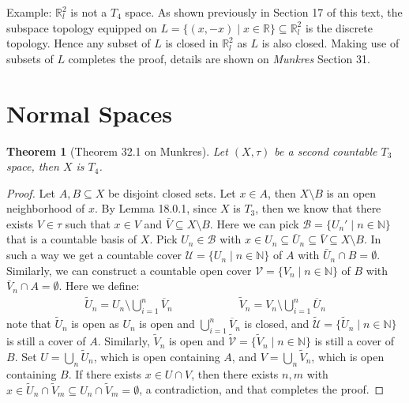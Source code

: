 \documentclass[11pt]{book}
\theoremstyle{break}
\theoremstyle{break}
\newtheorem{thm}{Theorem}[section]
\newcommand{\R}{\mathbb{R}}
\newcommand{\N}{\mathbb{N}}
\newcommand{\that}[1]{\widetilde{#1}}
\newcommand{\example}{\color{green}Example: \color{black}}
\begin{document}
\example $\R_l^2$ is not a $T_4$ space. As shown previously in Section 17 of this text, the subspace topology equipped on $L = \{(x,-x) \mid x \in \R\} \subseteq \R_l^2$ is the discrete topology. Hence any subset of $L$ is closed in $\R_l^2$ as $L$ is also closed. Making use of subsets of $L$ completes the proof, details are shown on \textit{Munkres} Section 31. 

\newpage
\section[Normal Spaces]{\color{red}Normal Spaces\color{black}}
\begin{thm}[Theorem 32.1 on Munkres]
Let $(X,\tau)$ be a second countable $T_3$ space, then $X$ is $T_4$. 
\end{thm}
\begin{proof}
Let $A,B\subseteq X$ be disjoint closed sets. Let $x \in A$, then $X\setminus B$ is an open neighborhood of $x$. By Lemma 18.0.1, since $X$ is $T_3$, then we know that there exists $V\in \tau$ such that $x \in V$ and $\bar{V} \subseteq X\setminus B$. Here we can pick $\mathcal{B} = \{U_n' \mid n \in \N\}$ that is a countable basis of $X$. Pick $U_n\in \mathcal{B}$ with $x \in U_n \subseteq \bar{U}_n\subseteq \bar{V}\subseteq  X\setminus B$. In such a way we get a countable cover $\mathcal{U} = \{U_n \mid n \in \N\}$ of $A$ with $\bar{U}_n \cap B = \emptyset$. Similarly, we can construct a countable open cover $\mathcal{V} = \{V_n \mid n \in \N\}$ of $B$ with $\bar{V}_n \cap A = \emptyset$. Here we define:
\begin{align*}
\that{U}_n = U_n \setminus \bigcup_{i=1}^n \overline{V}_n
\qquad\qquad\qquad 
\that{V}_n = V_n \setminus \bigcup_{i=1}^n \overline{U}_n
\end{align*}
note that $\that{U}_n$ is open as $U_n$ is open and $\bigcup_{i=1}^n \overline{V}_n$ is closed, and $\that{\mathcal{U}} = \{\that{U}_n \mid n \in \N\}$ is still a cover of $A$. Similarly, $\that{V}_n$ is open and $\that{\mathcal{V}} = \{\that{V}_n \mid n \in \N\}$ is still a cover of $B$. Set $U = \bigcup_{n}\that{U}_n$, which is open containing $A$, and $V = \bigcup_n \that{V}_n$, which is open containing $B$. If there exists $x \in U \cap V$, then there exists $n,m$ with $x \in \that{U}_n\cap \that{V}_m \subseteq U_n \cap \that{V}_m  = \emptyset$, a contradiction, and that completes the proof.   
\end{proof}
\end{document}
